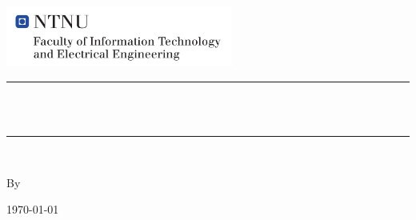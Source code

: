 \begin{titlepage}
\begin{center}

 
~\\[0.5cm]
\includegraphics[height=2.0cm]{Images/NTNU_logo.pdf}\\[1cm]  

\hrule ~\\[0.2cm]
{\huge \bfseries \mytitle}\\[1cm]		%
\hrule ~\\[4cm]

\begin{minipage}{1\textwidth}
    \centering
	\large
	By
		\myauthor
\end{minipage}

\vfill
{\large \today}
~\\[0.5cm]


\end{center}
\end{titlepage}